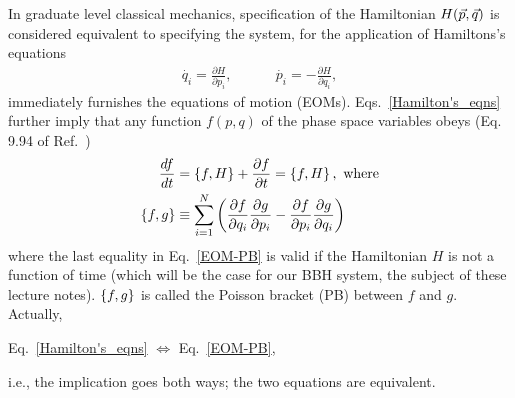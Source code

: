 In graduate level classical mechanics, specification of the Hamiltonian 
$H( \vec{p}, \vec{q})$ is considered equivalent to specifying the system, for 
the application of Hamiltons's equations  \cite{goldstein2013classical}
\begin{align}    \label{Hamilton's_eqns}
\dot{q_i} =  \frac{\partial H}{\partial p_i},~  ~~~~~~~~~~~~~
\dot{p_i} = - \frac{\partial H}{\partial q_i},
\end{align}
immediately furnishes the equations 
of motion (EOMs). Eqs.~\eqref{Hamilton's_eqns} further imply  that
any function $f(p,q)$ of the phase space variables obeys (Eq. 9.94 of
Ref.~\cite{goldstein2013classical})
\begin{align}    
\frac{d f}{d t}   & = \left\lbrace f, H \right\rbrace + \frac{\partial f}{\partial t} = \left\lbrace f, H \right\rbrace, ~~~~~~~~~~~~~~~~\text{where}    \label{EOM-PB}  \\
\{f, g\} &\equiv  \sum_{i=1}^{N}\left(\frac{\partial f}{\partial q_{i}} \frac{\partial g}{\partial p_{i}}-\frac{\partial f}{\partial p_{i}} \frac{\partial g}{\partial q_{i}}\right)    \label{PB_defined}
\end{align}
where the last equality in Eq.~\eqref{EOM-PB}
 is valid if the Hamiltonian $H$ is not a 
function of time (which will be the case for our BBH system, the subject of
these lecture notes). $\left\lbrace f,g \right\rbrace$ is called the Poisson bracket (PB)
between $f$ and $g$. Actually,
\begin{center}
Eq.~\eqref{Hamilton's_eqns}    $\Leftrightarrow$   Eq.~\eqref{EOM-PB},
\end{center}
i.e., the implication goes both ways; the two equations are equivalent.




